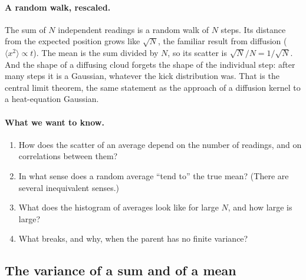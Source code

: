 \paragraph{A random walk, rescaled.}
The sum of $N$ independent readings is a random walk of $N$ steps. Its
distance from the expected position grows like $\sqrt N$, the familiar
result from diffusion ($\langle x^2\rangle\propto t$). The mean is the sum
divided by $N$, so its scatter is $\sqrt N/N=1/\sqrt N$. And the shape of a
diffusing cloud forgets the shape of the individual step: after many steps
it is a Gaussian, whatever the kick distribution was. That is the central
limit theorem, the same statement as the approach of a diffusion kernel to
a heat-equation Gaussian.

\paragraph{What we want to know.}
\begin{enumerate}[label=\arabic*.]
  \item How does the scatter of an average depend on the number of readings,
        and on correlations between them?
  \item In what sense does a random average ``tend to'' the true mean? (There
        are several inequivalent senses.)
  \item What does the histogram of averages look like for large $N$, and how
        large is large?
  \item What breaks, and why, when the parent has no finite variance?
\end{enumerate}

\subsection{The variance of a sum and of a mean}
\label{3a:sec:var-mean}

